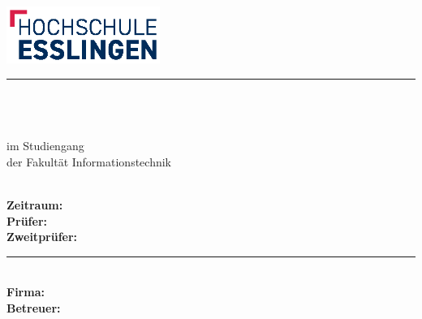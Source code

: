 \newcommand{\HRule}[2]{\noindent\rule[#1]{\linewidth}{#2}} %
\newcommand{\vlinespace}[1]{\vspace*{#1\baselineskip}} %
\newcommand{\titleemph}[1]{\textbf{#1}} %

\begin{titlepage}
 \sffamily %
      \hfill \includegraphics[width=5cm]{fig/aa-titel/HochschuleEsslingen_Logo_4c_DE}
      \HRule{13pt}{2pt} 
   \centering
      \Large
      \vlinespace{3}\\
      \workTyp\\
      \huge
      \workTitel\\
%
      \Large
      \vlinespace{2}
          im Studiengang \workStudiengang\\
          der Fakultät Informationstechnik\\
%      
      \workSemester\\
%     
      \vlinespace{2}
      \workNameStudent
%
   \vfill
   \raggedright
%   
   \large
   \titleemph{Zeitraum:} \workZeitraum \\ %
   \titleemph{Prüfer:} \workPruefer \\
   \titleemph{Zweitprüfer:} \workZweitPruefer \\ %

   \vlinespace{1}
   \HRule{10pt}{2pt} \\
   \titleemph{Firma:} \workFirma \hfill \workFirmenLogo \\
   \titleemph{Betreuer:} \workBetreuer 
%
\end{titlepage}
